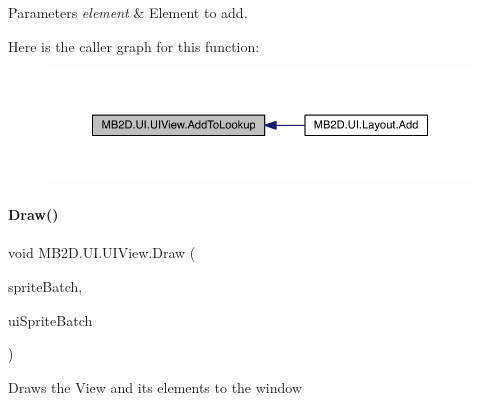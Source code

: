 \begin{DoxyParams}{Parameters}
{\em element} & Element to add.\\
\hline
\end{DoxyParams}
Here is the caller graph for this function\+:
\nopagebreak
\begin{figure}[H]
\begin{center}
\leavevmode
\includegraphics[width=350pt]{class_m_b2_d_1_1_u_i_1_1_u_i_view_aad1fdbf0c8a8d94cb57fff8b5ff43ec8_icgraph}
\end{center}
\end{figure}
\hypertarget{class_m_b2_d_1_1_u_i_1_1_u_i_view_a1f1acf013f17aa0738ff2d9b0516126e}{}\label{class_m_b2_d_1_1_u_i_1_1_u_i_view_a1f1acf013f17aa0738ff2d9b0516126e} 
\paragraph{\texorpdfstring{Draw()}{Draw()}}
{\footnotesize\ttfamily void M\+B2\+D.\+U\+I.\+U\+I\+View.\+Draw (\begin{DoxyParamCaption}\item[{Sprite\+Batch}]{sprite\+Batch,  }\item[{Sprite\+Batch}]{ui\+Sprite\+Batch }\end{DoxyParamCaption})\hspace{0.3cm}{\ttfamily [inline]}}



Draws the View and its elements to the window 


